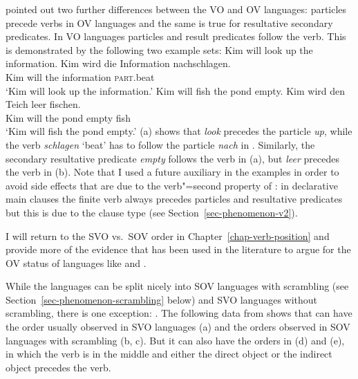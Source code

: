 \textcites[]{Haider2010a}[Section~15.2]{Haider2020a} pointed out two further differences between the  VO and OV languages:
particles precede verbs in OV languages \citep[Section~2.4]{Vikner2001a} and the same is true for resultative secondary
predicates. In VO languages particles and result predicates follow the verb. This is demonstrated by
the following two example sets:
\eal
\ex Kim will look up the information.
\ex 
\gll Kim wird die Information nachschlagen.\\
     Kim will the information \textsc{part}.beat\\
\glt `Kim will look up the information.'
\zl
\eal
\ex Kim will fish the pond empty.
\ex 
\gll Kim wird den Teich leer fischen.\\
     Kim will the pond  empty fish\\
\glt `Kim will fish the pond empty.'
\zl
(a) shows that \emph{look} precedes the particle \emph{up}, while the verb \emph{schlagen}
`beat' has to follow the particle \emph{nach} in . Similarly, the secondary resultative
predicate \emph{empty} follows the verb in (a), but \emph{leer} precedes the verb in
(b). Note that I used a future auxiliary in the examples in order to avoid side effects that
are due to the verb"=second property of : in declarative main clauses the finite verb always
precedes particles and resultative predicates but this is due to the clause type (see Section~\ref{sec-phenomenon-v2}).

\largerpage[-2]
I will return to the SVO vs.\ SOV order in Chapter~\ref{chap-verb-position} and provide more of the
evidence that has been used in the literature to argue for the OV status of languages like  and .

While the  languages can be split nicely into SOV languages with scrambling (see
Section~\ref{sec-phenomenon-scrambling} below) and SVO languages without scrambling, there is one
exception: . The following data from \citet[]{Diesing97a} shows that 
can have the order usually observed in SVO languages (a) and the orders observed in SOV
languages with scrambling (b, c). But it can also have the orders in (d) and
(e), in which the verb is in the middle and either the direct object or the indirect object
precedes the verb.

